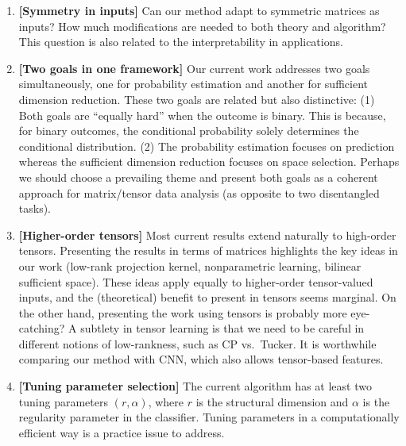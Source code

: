 \documentclass[11pt]{article}
\theoremstyle{plain}
\theoremstyle{definition}
\begin{document}
\begin{enumerate}
\item[] {\bf [Symmetry in inputs]} Can our method adapt to symmetric matrices as inputs? How much modifications are needed to both theory and algorithm? This question is also related to the interpretability in applications. 
\item[] {\bf [Two goals in one framework]} Our current work addresses two goals simultaneously, one for probability estimation and another for sufficient dimension reduction. These two goals are related but also distinctive:  (1) Both goals are ``equally hard'' when the outcome is binary. This is because, for binary outcomes, the conditional probability solely determines the conditional distribution. (2) The probability estimation focuses on prediction whereas the sufficient dimension reduction focuses on space selection. Perhaps we should choose a prevailing theme and present both goals as a coherent approach for matrix/tensor data analysis (as opposite to two disentangled tasks). 

\item[] {\bf [Higher-order tensors]} Most current results extend naturally to high-order tensors. Presenting the results in terms of matrices highlights the key ideas in our work (low-rank projection kernel, nonparametric learning, bilinear sufficient space). These ideas apply equally to higher-order tensor-valued inputs, and the (theoretical) benefit to present in tensors seems marginal. On the other hand, presenting the work using tensors is probably more eye-catching? A subtlety in tensor learning is that we need to be careful in different notions of low-rankness, such as CP vs.\ Tucker. It is worthwhile comparing our method with CNN, which also allows tensor-based features.  
\item[] {\bf [Tuning parameter selection]} The current algorithm has at least two tuning parameters $(r, \alpha)$, where $r$ is the structural dimension and $\alpha$ is the regularity parameter in the classifier. Tuning parameters in a computationally efficient way is a practice issue to address. 


\end{enumerate}
\end{document}
